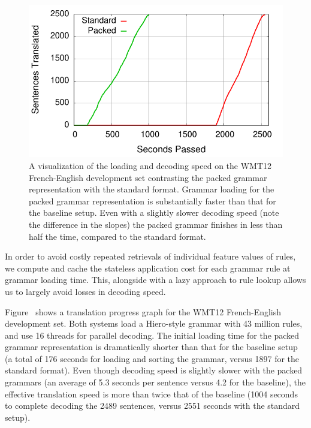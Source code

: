 \documentclass[11pt]{article}
\begin{document}
\begin{figure}[!t]
  \begin{center}
    \includegraphics[width=0.99\linewidth]{figures/progress.pdf}
  \end{center}
  \label{fig:speed}
  \caption{A visualization of the loading and decoding speed on the
    WMT12 French-English development set contrasting the packed
    grammar representation with the standard format. Grammar loading
    for the packed grammar representation is substantially faster than
    that for the baseline setup. Even with a slightly slower decoding
    speed (note the difference in the slopes) the packed grammar
    finishes in less than half the time, compared to the standard
    format.}
\end{figure}

In order to avoid costly repeated retrievals of individual feature
values of rules, we compute and cache the stateless application cost
for each grammar rule at grammar loading time. This, alongside with a
lazy approach to rule lookup allows us to largely avoid losses in
decoding speed.

Figure~\label{fig:speed} shows a translation progress graph for the
WMT12 French-English development set. Both systems load a Hiero-style
grammar with 43 million rules, and use 16 threads for parallel
decoding. The initial loading time for the packed grammar
representation is dramatically shorter than that for the baseline
setup (a total of 176 seconds for loading and sorting the grammar,
versus 1897 for the standard format). Even though decoding speed is
slightly slower with the packed grammars (an average of 5.3 seconds
per sentence versus 4.2 for the baseline), the effective translation
speed is more than twice that of the baseline (1004 seconds to
complete decoding the 2489 sentences, versus 2551 seconds with the
standard setup).
\end{document}

